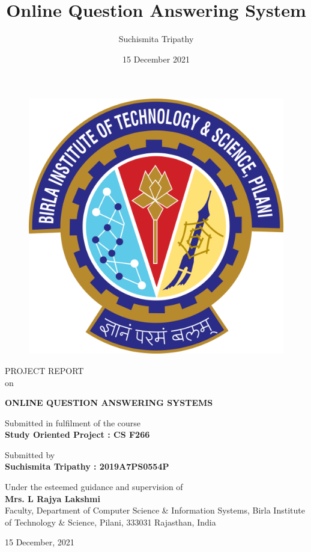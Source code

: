 \documentclass[12pt, a4paper]{article}
\title{Online Question Answering System}
\author{Suchismita Tripathy}
\date{15 December 2021}
\begin{document}
\thispagestyle{empty} 
	
	\begin{center}
	
	\vspace{-2cm}
	\begin{figure}[h]
    \includegraphics[scale=0.1]{bits logo.png} 
    \centering
	\end{figure}
	
	\vspace{0.8cm}
	\Large
	PROJECT REPORT 
	\\ on  
	
	\vspace{0.8cm}
	\LARGE
	\textbf{ONLINE QUESTION ANSWERING SYSTEMS}
	
	\vspace{1.3cm}	
	\Large
	Submitted in fulfilment of the course 
	\\ \textbf{Study Oriented Project : CS F266}

	\vspace{1cm}
	\large 
	Submitted by \\
	\Large
	\textbf{Suchismita Tripathy : 2019A7PS0554P}
	
	\vspace{1cm}
	\large
	Under the esteemed guidance and supervision of \\
	\Large
	\textbf{Mrs. L Rajya Lakshmi} \\
    \large
    Faculty, Department of Computer Science \& Information Systems, Birla Institute of Technology \& Science, Pilani, 333031 Rajasthan, India 
	
	\vspace{0.6cm}
	15 December, 2021
	\end{center} 
\end{document}
